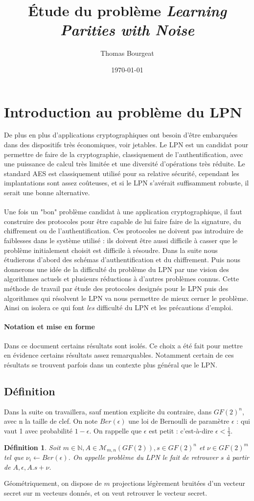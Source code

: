 \documentclass{article}		%
\newtheorem{defi}{Définition}
\theoremstyle{definition}
\theoremstyle{plain}
\theoremstyle{plain}
\theoremstyle{plain}
\theoremstyle{plain}
\theoremstyle{plain}
\begin{document}
\title{Étude du problème \emph{Learning Parities with
Noise}}
\author{Thomas Bourgeat}
\date\today
\maketitle
\section{Introduction au problème du LPN}
De plus en plus d'applications cryptographiques ont besoin d'être embarquées dans des dispositifs très économiques, voir jetables. Le LPN est un candidat
pour permettre de faire de la cryptographie, classiquement de
l'authentification, avec une puissance de calcul
très limitée et une diversité d'opérations très réduite.
Le standard AES est classiquement utilisé pour sa relative sécurité,
cependant les implantations sont assez coûteuses, et si le LPN s'avérait suffisamment
robuste, il serait une bonne alternative.
\\\\
Une fois un "bon" problème candidat à une application cryptographique, il
faut construire des protocoles pour être capable de lui faire faire de la
signature, du chiffrement ou de l'authentification. Ces protocoles ne
doivent pas introduire de faiblesses dans le système utilisé : ils doivent
être aussi difficile à casser que le problème initialement choisit est
difficile à résoudre.
Dans la suite nous étudierons d'abord des schémas d'authentification et du
chiffrement. Puis nous donnerons une idée de la difficulté du
problème du LPN par une vision des algorithmes actuels et plusieurs
réductions à d'autres problèmes connus. Cette méthode de travail par
étude des protocoles designés pour le LPN puis des algorithmes qui
résolvent le LPN va nous permettre de mieux cerner le problème. Ainsi on
isolera ce qui font \emph{les} difficulté du LPN et les précautions d'emploi. 
\paragraph{Notation et mise en forme}
Dans ce document certains résultats sont isolés. Ce choix a été fait pour
mettre en évidence certains résultats assez remarquables. Notamment
certain de ces résultats
se trouvent parfois dans un contexte plus général que le LPN. 
\subsection{Définition}
Dans la suite on travaillera, sauf mention explicite du contraire, dans
$GF(2)^n$, avec n la taille de clef. On note $Ber(\epsilon)$
une loi de Bernoulli de paramètre $\epsilon$ : qui vaut 1 avec
probabilité $1-\epsilon$. On rappelle que $\epsilon$ est petit : c'est-à-dire $\epsilon < \frac {1}{2}$.  
\begin{defi}
Soit $m \in \mathbb{N}, A \in \mathcal{M}_{m, n}(GF(2)), s \in GF(2)^n$ et
$\nu \in GF(2)^m$ tel que $\nu_i \leftarrow Ber(\epsilon)$. On appelle
problème du LPN le fait de retrouver $s$ à partir de $A, \epsilon,
A.s+\nu$. 
\end{defi}
Géométriquement, on dispose de $m$ projections légèrement bruitées d'un vecteur secret sur m
vecteurs donnés, et on veut retrouver le vecteur secret.
\end{document}
